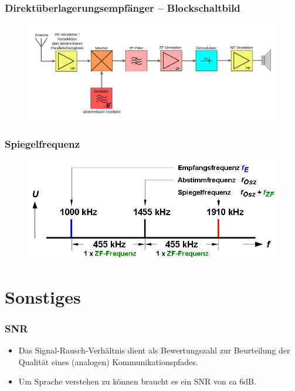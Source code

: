 \begin{frame}
  \frametitle{Direktüberlagerungsempfänger -- Blockschaltbild}
  \begin{center}
    \begin{figure}
      \includegraphics[width=.99\textwidth]{e15/Ueberlagerungsempfanger_blockschaltbild.png}
    \end{figure}
  \end{center}
\end{frame}

\begin{frame}
  \frametitle{Spiegelfrequenz}
  \begin{center}
    \begin{figure}
      \includegraphics[width=.99\textwidth]{e15/Uberlagerungsempfanger_Spiegelfrequenz.png}
    \end{figure}
  \end{center}
\end{frame}

\section*{Sonstiges}
\begin{frame}
  \frametitle{SNR}
  \begin{itemize}
    \item Das Signal-Rausch-Verhältnis dient als Bewertungszahl zur Beurteilung der Qualität eines (analogen) Kommunikationspfades.
    \item Um Sprache verstehen zu können braucht es ein SNR von ca 6dB.
  \end{itemize}
\end{frame}

